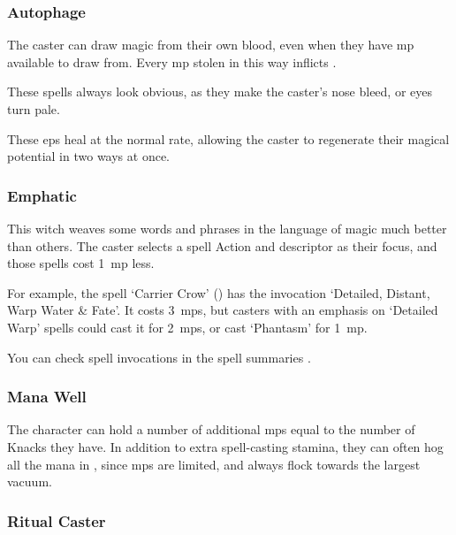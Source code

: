 \begin{multicols}{2}


\subsubsection{Autophage}

The caster can draw magic from their own blood, even when they have \gls{mp} available to draw from.
Every \gls{mp} stolen in this way inflicts .

These spells always look obvious, as they make the caster's nose bleed, or eyes turn pale.

These \glspl{ep} heal at the normal rate, allowing the caster to regenerate their magical potential in two ways at once.

\subsubsection{Emphatic}
\label{emphaticCaster}

This \gls{witch} weaves some words and phrases in the language of magic much better than others.
The caster selects a spell Action and \gls{descriptor} as their focus, and those spells cost 1~\gls{mp} less.

For example, the spell `Carrier Crow' () has the invocation `Detailed, Distant, Warp Water \& Fate'.
It costs 3~\glspl{mp}, but casters with an emphasis on `Detailed Warp' spells could cast it for 2~\glspl{mp}, or cast `Phantasm' for 1~\gls{mp}.

You can check spell \glspl{invocation} in the spell summaries .

\subsubsection{Mana Well}
\label{manaWell}

The character can hold a number of additional \glspl{mp} equal to the number of Knacks they have.
In addition to extra spell-casting stamina, they can often hog all the mana in , since \glspl{mp} are limited, and always flock towards the largest vacuum.

\subsubsection{Ritual Caster}
\label{ritualCaster}


\end{multicols}
